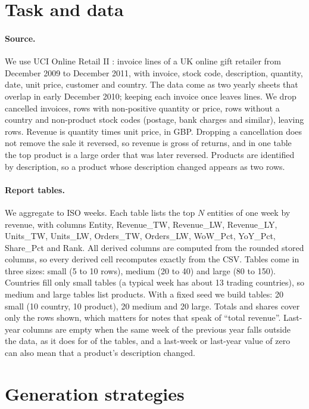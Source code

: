\documentclass[11pt]{article}
\begin{document}
\section{Task and data}
\label{sec:data}

\paragraph{Source.} We use UCI Online Retail II \citep{chen2012onlineretail}: invoice lines of a UK online gift retailer from December 2009 to December 2011, with invoice, stock code, description, quantity, date, unit price, customer and country. The data come as two yearly sheets that overlap in early December 2010; keeping each invoice once leaves \NRawRows{} lines. We drop cancelled invoices, rows with non-positive quantity or price, rows without a country and non-product stock codes (postage, bank charges and similar), leaving \NCleanRows{} rows. Revenue is quantity times unit price, in GBP. Dropping a cancellation does not remove the sale it reversed, so revenue is gross of returns, and in one table the top product is a large order that was later reversed. Products are identified by description, so a product whose description changed appears as two rows.

\paragraph{Report tables.} We aggregate to ISO weeks. Each table lists the top $N$ entities of one week by revenue, with columns Entity, Revenue\_TW, Revenue\_LW, Revenue\_LY, Units\_TW, Units\_LW, Orders\_TW, Orders\_LW, WoW\_Pct, YoY\_Pct, Share\_Pct and Rank. All derived columns are computed from the rounded stored columns, so every derived cell recomputes exactly from the CSV. Tables come in three sizes: small (5 to 10 rows), medium (20 to 40) and large (80 to 150). Countries fill only small tables (a typical week has about 13 trading countries), so medium and large tables list products. With a fixed seed we build \NTables{} tables: 20 small (10 country, 10 product), 20 medium and 20 large. Totals and shares cover only the rows shown, which matters for notes that speak of ``total revenue''. Last-year columns are empty when the same week of the previous year falls outside the data, as it does for \NoLYTables{} of the \NTables{} tables, and a last-week or last-year value of zero can also mean that a product's description changed.

\section{Generation strategies}
\label{sec:strategies}
\end{document}
